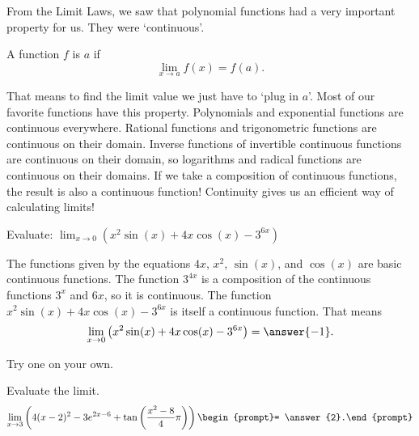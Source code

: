 \documentclass{ximera}
\begin{document}
From the Limit Laws, we saw that polynomial functions had a very important property for us.  They were `continuous'.
\begin{definition}
  A function $f$ is  $a$ if
  \[
  \lim_{x\to a}f(x) = f(a).
  \]
\end{definition}
That means to find the limit value we just have to `plug in $a$'.  Most of our favorite functions have this property.  Polynomials and exponential functions are continuous everywhere.
Rational functions and trigonometric functions are continuous on their domain.  Inverse functions of invertible continuous functions are continuous on their domain, so logarithms and
radical functions are continuous on their domains.  If we take a composition of continuous functions, the result is also a continuous function!  Continuity gives us an efficient way of calculating
limits!

\begin{example}
	Evaluate: $\displaystyle \lim_{x\to 0} \left(x^2 \sin(x) + 4x\cos(x) - 3^{6x} \right)$
	\begin{explanation}
		The functions given by the equations $4x$, $x^2$, $\sin(x)$, and $\cos(x)$ are basic continuous functions.  The function $3^{4x}$ is a composition
		of the continuous functions $3^x$ and $6x$, so it is continuous.  The function $x^2 \sin(x) + 4x\cos(x) - 3^{6x}$ is itself a continuous function.  That means
		\[ \lim_{x\to 0} \left( x^2 \sin(x) + 4x \cos(x) - 3^{6x} \right) = \answer{-1}. \]
	\end{explanation}
\end{example}

Try one on your own.
\begin{problem}
	Evaluate the limit.
	\[ \lim_{x \to 3} \left( 4(x-2)^2 - 3e^{2x-6}+ \tan\left( \frac{x^2-8}{4} \pi \right) \right) \begin{prompt}= \answer{2}.\end{prompt} \]
\end{problem}
\end{document}
